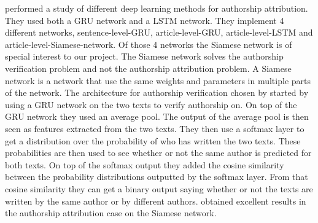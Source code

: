 \cite{qian:2018} performed a study of different deep learning methods
for authorship attribution. They used both a \gls{GRU} network
and a \gls{LSTM} network. They implement 4 different networks,
sentence-level-\gls{GRU}, article-level-\gls{GRU}, article-level-\gls{LSTM}
and article-level-Siamese-network. Of those 4 networks the Siamese network is
of special interest to our project. The Siamese network solves the authorship
verification problem and not the authorship attribution problem. A Siamese
network is a network that use the same weights and parameters in multiple
parts of the network. The architecture for authorship verification chosen by
\cite{qian:2018} started by using a \gls{GRU} network on the two texts to
verify authorship on. On top of the \gls{GRU} network they used an average
pool. The output of the average pool is then seen as features extracted from
the two texts. They then use a softmax layer to get a distribution over the
probability of who has written the two texts. These probabilities are then used
to see whether or not the same author is predicted for both texts. On top of
the softmax output they added the cosine similarity between the probability
distributions outputted by the softmax layer. From that cosine similarity they
can get a binary output saying whether or not the texts are written by the same
author or by different authors. \cite{qian:2018} obtained excellent results in
the authorship attribution case on the Siamese network.
